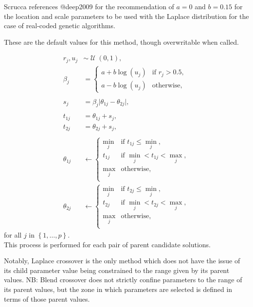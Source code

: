 \documentclass[
  a4paper,
]{article}
\newcommand{\+}{\phantom{-}}
\newcommand{\op}[2]{\operatorname{#1}\left(#2\right)}
\begin{document}
\begin{tcolorbox}[title=Laplace crossover: \texttt{gareal\_laplaceCrossover()}]
Scrucca references @deep2009 for the recommendation of $a=0$ and $b=0.15$ for the location and scale parameters to be used with the Laplace distribution for the case of real-coded genetic algorithms.

These are the default values for this method, though overwritable when called.

$$
\begin{aligned}
r_j,u_j &\sim \op{\mathcal U}{0,1},\\
\beta_j &= \begin{cases}
a+b\log\left(u_j\right) & \text{if } r_j > 0.5, \\
a-b\log\left(u_j\right) & \text{otherwise},
\end{cases}\\
\\
s_j &= \beta_j \lvert \theta_{1j} - \theta_{2j} \rvert, \\
\\
t_{1j} &= \theta_{1j} + s_j,\\
t_{2j} &= \theta_{2j} + s_j, \\
\\
\theta_{1j} &\leftarrow 
\begin{cases}
\min_j & \text{if } t_{1j} \leq \min_j,\\
t_{1j} & \text{if } \min_j < t_{1j} < \max_j,\\
\max_j & \text{otherwise},\\
\end{cases}\\
\theta_{2j} &\leftarrow
\begin{cases}
\min_j & \text{if } t_{2j} \leq \min_j,\\
t_{2j} & \text{if } \min_j < t_{2j} < \max_j,\\
\max_j & \text{otherwise},\\
\end{cases}
\end{aligned}
$$
for all $j$ in $\left\{1, \dots, p\right\}$.\\

This process is performed for each pair of parent candidate solutions.
\end{tcolorbox}

Notably, Laplace crossover is the only method which does not have the
issue of its child parameter value being constrained to the range given
by its parent values. NB: Blend crossover does not strictly confine
parameters to the range of its parent values, but the zone in which
parameters are selected is defined in terms of those parent values.
\end{document}
